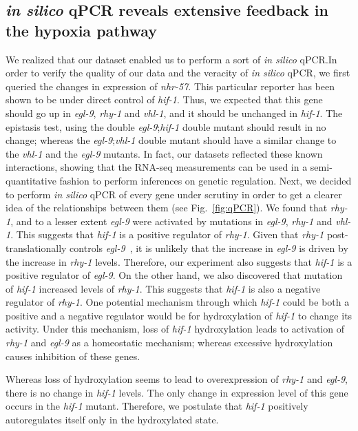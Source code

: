 \documentclass[9pt,twocolumn,twoside]{pnas-new}
\newcommand{\egl}{\emph{egl-9}}
\newcommand{\rhy}{\emph{rhy-1}}
\newcommand{\vhl}{\emph{vhl-1}}
\newcommand{\hif}{\emph{hif-1}}
\newcommand{\nhr}{\emph{nhr-57}}
\begin{document}
\subsection{\emph{in silico} qPCR reveals extensive feedback in the hypoxia pathway}
\label{sub:qPCR}
We realized that our dataset enabled us to perform a sort of \emph{in silico} qPCR.\@ In order to verify the quality of our data and the veracity of \emph{in silico} qPCR, we first queried the changes in expression of \nhr{}. This particular reporter has been shown to be under direct control of \hif{}. Thus, we expected that this gene should go up in \egl{}, \rhy{} and \vhl{}, and it should be unchanged in \hif{}. The epistasis test, using the double \egl{};\hif{} double mutant should result in no change; whereas the \egl{};\vhl{} double mutant should have a similar change to the \vhl{} and the \egl{} mutants. In fact, our datasets reflected these known interactions, showing that the RNA-seq measurements can be used in a semi-quantitative fashion to perform inferences on genetic regulation.
Next, we decided to perform \emph{in silico} qPCR of every gene under scrutiny in order to get a clearer idea of the relationships between them (see Fig.~\ref{fig:qPCR}). We found that \rhy{}, and to a lesser extent \egl{} were activated by mutations in \egl{}, \rhy{} and \vhl{}. This suggests that \hif{} is a positive regulator of \rhy{}.
Given that \rhy{} post-translationally controls \egl{}~\cite{}, it is unlikely that the increase in \egl{} is driven by the increase in \rhy{} levels. Therefore, our experiment also suggests that \hif{} is a positive regulator of \egl{}. On the other hand, we also discovered that mutation of \hif{} increased levels of \rhy{}. This suggests that \hif{} is also a negative regulator of \rhy{}. One potential mechanism through which \hif{} could be both a positive and a negative regulator would be for hydroxylation of \hif{} to change its activity. Under this mechanism, loss of \hif{} hydroxylation leads to activation of \rhy{} and \egl{} as a homeostatic mechanism; whereas excessive hydroxylation causes inhibition of these genes.

Whereas loss of hydroxylation seems to lead to overexpression of \rhy{} and \egl{}, there is no change in \hif{} levels. The only change in expression level of this gene occurs in the \hif{} mutant. Therefore, we postulate that \hif{} positively autoregulates itself only in the hydroxylated state.
\end{document}
